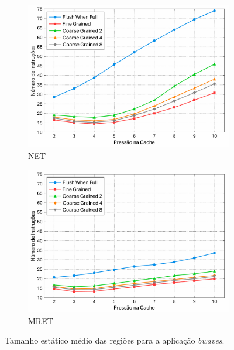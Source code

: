 \documentclass[12pt,twoside]{article}
\begin{document}
\begin{figure}[!ht]
        \centering
        \begin{subfigure}[b]{0.48\textwidth}
                \includegraphics[width=\textwidth]{./figs/net-bwaves-average-reg-size}
                \caption{NET}
                \label{fig-net-bwaves-average-reg-size}
        \end{subfigure}
        \quad 
                \begin{subfigure}[b]{0.48\textwidth}
                \includegraphics[width=\textwidth]{./figs/mret-bwaves-average-reg-size}
                \caption{MRET}
                \label{fig-mret-bwaves-average-reg-size}
        \end{subfigure}
\caption{Tamanho estático médio das regiões para a aplicação \emph{bwaves}.}
\label{fig-avg-regsize}
\end{figure}
\end{document}

